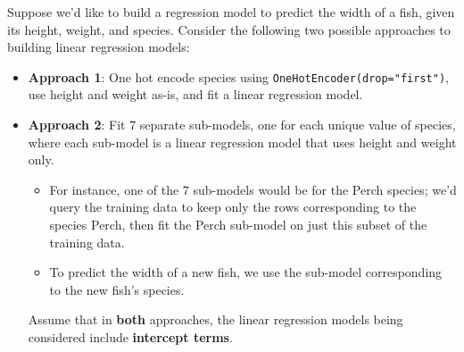 \documentclass[twoside,12pt]{article}
\begin{document}
\begin{probset}
\begin{prob}[(6 pts)]
\begin{subprobset}
\begin{subprob}



\end{subprob}
    
\end{subprobset}
    
\end{prob}

\newpage

\begin{prob}[(14 pts)]

Suppose we'd like to build a regression model to predict the width of a fish, given its height, weight, and species. Consider the following two possible approaches to building linear regression models:

\begin{itemize}
\item \textbf{Approach 1}: One hot encode species using \texttt{OneHotEncoder(drop="first")}, use height and weight as-is, and fit a linear regression model.
\item \textbf{Approach 2}: Fit 7 separate sub-models, one for each unique value of species, where each sub-model is a linear regression model that uses height and weight only.

    \begin{itemize}

    \item For instance, one of the 7 sub-models would be for the Perch species; we'd query the training data to keep only the rows corresponding to the species Perch, then fit the Perch sub-model on just this subset of the training data. 
    
    \item To predict the width of a new fish, we use the sub-model corresponding to the new fish's species.
    
    \end{itemize}

Assume that in \textbf{both} approaches, the linear regression models being considered include \textbf{intercept terms}.

\end{itemize}

\begin{subprobset}


\end{subprobset}
\end{prob}
\end{probset}
\end{document}
